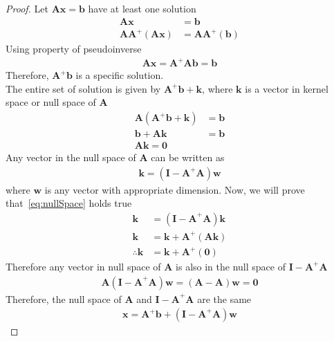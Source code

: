 \documentclass{beamer}
\providecommand{\brak}[1]{\ensuremath{\left(#1\right)}}
\renewcommand{\vec}[1]{\boldsymbol{#1}}
\begin{document}
\begin{frame}
    \begin{proof}
        Let $\vec{Ax}=\vec{b}$ have at least one solution
        \begin{align}
            \vec{Ax}&=\vec{b}\\
            \vec{AA}^+(\vec{Ax})&=\vec{AA}^+(\vec{b})
        \end{align}
        Using property of pseudoinverse
        \begin{align}
            \vec{Ax}=\vec{A}^+\vec{Ab}=\vec{b}
        \end{align}
        Therefore, $\vec{A}^+\vec{b}$ is a specific solution.\\
        The entire set of solution is given by $\vec{A}^+\vec{b}+\vec{k}$, where $\vec{k}$ is a vector in kernel space or null space of $\vec{A}$
        \begin{align}
            \vec{A}\brak{\vec{A}^+\vec{b}+\vec{k}}&=\vec{b}\\
            \vec{b}+\vec{Ak}&=\vec{b}\\
            \vec{Ak}=\vec{0}
        \end{align}
        Any vector in the null space of $\vec{A}$ can be written as
        \begin{align}
            \vec{k}=(\vec{I}-\vec{A}^+\vec{A})\vec{w} \label{eq:nullSpace}
        \end{align}
        where $\vec{w}$ is any vector with appropriate dimension.       
        Now, we will prove that~\eqref{eq:nullSpace} holds true
        \begin{align}
            \vec{k}&=(\vec{I-A}^+\vec{A})\vec{k}\\
            \vec{k}&=\vec{k}+\vec{A}^+(\vec{Ak})\\
            \therefore \vec{k}&=\vec{k}+\vec{A}^+(\vec{0})
        \end{align}
        Therefore any vector in null space of $\vec{A}$ is also in the null space of $ \vec{I-A}^+\vec{A} $
        \begin{align}
            \vec{A}(\vec{I-A}^+\vec{A})\vec{w}=(\vec{A}-\vec{A})\vec{w}=\vec{0}
        \end{align}
        Therefore, the null space of $\vec{A}$ and $\vec{I-A}^+\vec{A}$ are the same
        \begin{align}
            \vec{x}=\vec{A}^+\vec{b}+(\vec{I-A}^+\vec{A})\vec{w}
        \end{align}
        \end{proof}
\end{frame}
\end{document}
